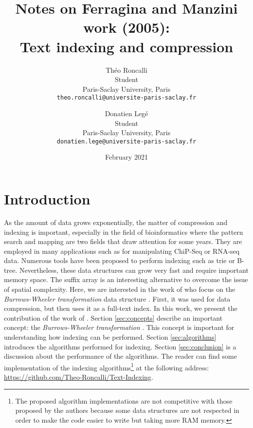 \documentclass[11pt,twoside]{article}
\theoremstyle{definition}
\begin{document}
\title{\textbf{\color{amundi_blue}Notes on Ferragina and Manzini work (2005):\\Text indexing and compression}}

\author{
{\color{amundi_dark_blue} Th\'eo Roncalli} \\
Student \\
Paris-Saclay University, Paris \\
\texttt{theo.roncalli@universite-paris-saclay.fr} \and
{\color{amundi_dark_blue} Donatien Leg\'e} \\
Student \\
Paris-Saclay University, Paris \\
\texttt{donatien.lege@universite-paris-saclay.fr}}

\date{\color{amundi_dark_blue}February 2021}

\maketitle

\clearpage

\section{Introduction}

As the amount of data grows exponentially, the matter of compression and indexing is important, especially in the field of bioinformatics where the pattern search and mapping are two fields that draw attention for some years. They are employed in many applications such as for manipulating ChiP-Seq or RNA-seq data. Numerous tools have been proposed to perform indexing such as trie or B-tree. Nevertheless, these data structures can grow very fast and require important memory space. The suffix array is an interesting alternative to overcome the issue of spatial complexity. Here, we are interested in the work of \citet{Ferragina-2005} who focus on the \textit{Burrows-Wheeler transformation} data structure \citep{Burrows-1994}. First, it was used for data compression, but then \citet{Ferragina-2005} uses it as a full-text index. In this work, we present the contribution of the work of \citet{Ferragina-2005}. Section \ref{sec:concepts} describe an important concept: the \textit{Burrows-Wheeler transformation} \citep{Burrows-1994}. This concept is important for understanding how indexing can be performed. Section \ref{sec:algorithms} introduces the algorithms performed for indexing. Section \ref{sec:conclusion} is a discussion about the performance of the algorithms. The reader can find some implementation of the indexing algorithms\footnote{The proposed algorithm implementations are not competitive with those proposed by the authors because some data structures are not respected in order to make the code easier to write but taking more RAM memory.} at the following address: \url{https://github.com/Theo-Roncalli/Text-Indexing}.
\end{document}
